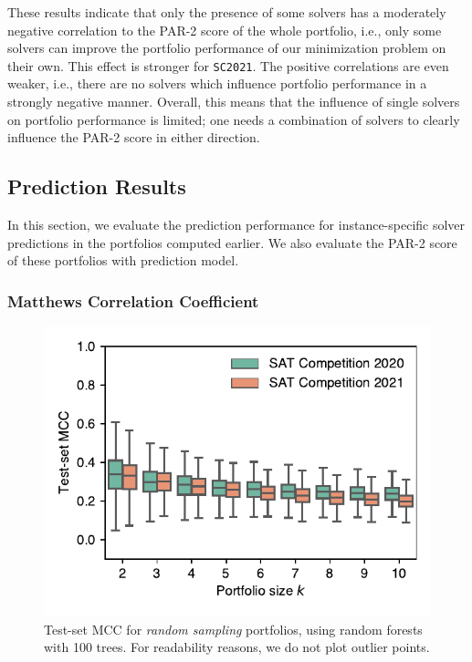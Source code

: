 \documentclass[conference]{IEEEtran}
\begin{document}
These results indicate that only the presence of some solvers has a moderately negative correlation to the PAR-2 score of the whole portfolio, i.e., only some solvers can improve the portfolio performance of our minimization problem on their own.
This effect is stronger for \texttt{SC2021}.
The positive correlations are even weaker, i.e., there are no solvers which influence portfolio performance in a strongly negative manner.
Overall, this means that the influence of single solvers on portfolio performance is limited; one needs a combination of solvers to clearly influence the PAR-2 score in either direction.

\subsection{Prediction Results}

In this section, we evaluate the prediction performance for instance-specific solver predictions in the portfolios computed earlier. 
We also evaluate the PAR-2 score of these portfolios with prediction model. %

\subsubsection{Matthews Correlation Coefficient}

\begin{figure}[t]
\centering
\includegraphics[width=.9\columnwidth]{plots/prediction-test-mcc.pdf}
\caption{Test-set MCC for \emph{random sampling} portfolios, using random forests with 100 trees.	For readability reasons, we do not plot outlier points.
}
\label{fig:prediction-test-mcc}
\end{figure}
\end{document}
